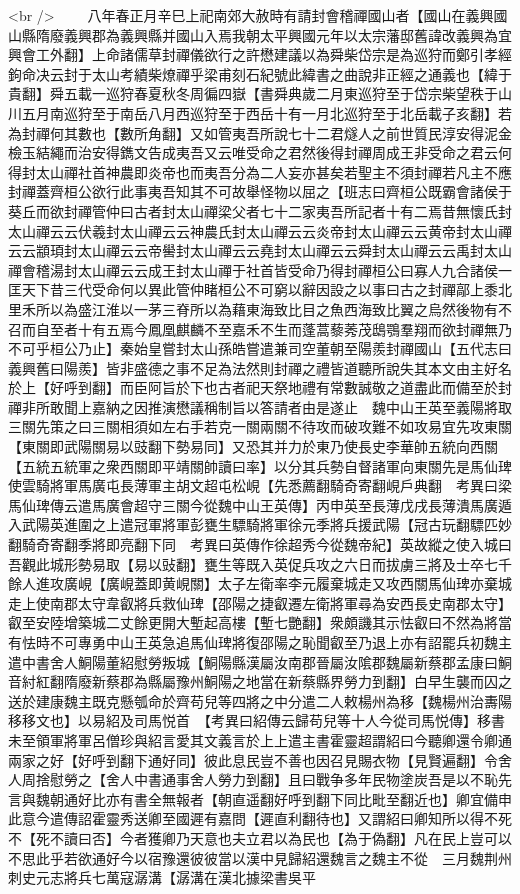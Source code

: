 <br />
　　八年春正月辛巳上祀南郊大赦時有請封會稽禪國山者【國山在義興國山縣隋廢義興郡為義興縣并國山入焉我朝太平興國元年以太宗藩邸舊諱改義興為宜興會工外翻】上命諸儒草封禪儀欲行之許懋建議以為舜柴岱宗是為巡狩而鄭引孝經鉤命决云封于太山考績柴燎禪乎梁甫刻石紀號此緯書之曲說非正經之通義也【緯于貴翻】舜五載一巡狩春夏秋冬周徧四嶽【書舜典歲二月東巡狩至于岱宗柴望秩于山川五月南巡狩至于南岳八月西巡狩至于西岳十有一月北巡狩至于北岳載子亥翻】若為封禪何其數也【數所角翻】又如管夷吾所說七十二君燧人之前世質民淳安得泥金檢玉結繩而治安得鐫文告成夷吾又云唯受命之君然後得封禪周成王非受命之君云何得封太山禪社首神農即炎帝也而夷吾分為二人妄亦甚矣若聖主不須封禪若凡主不應封禪蓋齊桓公欲行此事夷吾知其不可故舉怪物以屈之【班志曰齊桓公既霸會諸侯于葵丘而欲封禪管仲曰古者封太山禪梁父者七十二家夷吾所記者十有二焉昔無懷氏封太山禪云云伏羲封太山禪云云神農氏封太山禪云云炎帝封太山禪云云黄帝封太山禪云云顓頊封太山禪云云帝嚳封太山禪云云堯封太山禪云云舜封太山禪云云禹封太山禪會稽湯封太山禪云云成王封太山禪于社首皆受命乃得封禪桓公曰寡人九合諸侯一匡天下昔三代受命何以異此管仲睹桓公不可窮以辭因設之以事曰古之封禪鄗上黍北里禾所以為盛江淮以一茅三脊所以為藉東海致比目之魚西海致比翼之烏然後物有不召而自至者十有五焉今鳳凰麒麟不至嘉禾不生而蓬蒿藜莠茂鴟鶚羣翔而欲封禪無乃不可乎桓公乃止】秦始皇嘗封太山孫皓嘗遣兼司空董朝至陽羨封禪國山【五代志曰義興舊曰陽羨】皆非盛德之事不足為法然則封禪之禮皆道聽所說失其本文由主好名於上【好呼到翻】而臣阿旨於下也古者祀天祭地禮有常數誠敬之道盡此而備至於封禪非所敢聞上嘉納之因推演懋議稱制旨以答請者由是遂止　魏中山王英至義陽將取三關先策之曰三關相須如左右手若克一關兩關不待攻而破攻難不如攻易宜先攻東關【東關即武陽關易以豉翻下勢易同】又恐其并力於東乃使長史李華帥五統向西關【五統五統軍之衆西關即平靖關帥讀曰率】以分其兵勢自督諸軍向東關先是馬仙琕使雲騎將軍馬廣屯長薄軍主胡文超屯松峴【先悉薦翻騎奇寄翻峴戶典翻　考異曰梁馬仙琕傳云遣馬廣會超守三關今從魏中山王英傳】丙申英至長薄戊戌長薄潰馬廣遁入武陽英進圍之上遣冠軍將軍彭甕生驃騎將軍徐元季將兵援武陽【冠古玩翻驃匹妙翻騎奇寄翻季將即亮翻下同　考異曰英傳作徐超秀今從魏帝紀】英故縱之使入城曰吾觀此城形勢易取【易以䜴翻】甕生等既入英促兵攻之六日而拔虜三將及士卒七千餘人進攻廣峴【廣峴蓋即黄峴關】太子左衛率李元履棄城走又攻西關馬仙琕亦棄城走上使南郡太守韋叡將兵救仙琕【邵陽之捷叡遷左衛將軍尋為安西長史南郡太守】叡至安陸增築城二丈餘更開大塹起高樓【塹七艷翻】衆頗譏其示怯叡曰不然為將當有怯時不可專勇中山王英急追馬仙琕將復邵陽之恥聞叡至乃退上亦有詔罷兵初魏主遣中書舍人鮦陽董紹慰勞叛城【鮦陽縣漢屬汝南郡晉屬汝隂郡魏屬新蔡郡孟康曰鮦音紂紅翻隋廢新蔡郡為縣屬豫州鮦陽之地當在新蔡縣界勞力到翻】白早生襲而囚之送於建康魏主既克懸瓠命於齊苟兒等四將之中分遣二人敕楊州為移【魏楊州治夀陽移移文也】以易紹及司馬悦首　【考異曰紹傳云歸苟兒等十人今從司馬悦傳】移書未至領軍將軍呂僧珍與紹言愛其文義言於上上遣主書霍靈超謂紹曰今聽卿還令卿通兩家之好【好呼到翻下通好同】彼此息民豈不善也因召見賜衣物【見賢遍翻】令舍人周捨慰勞之【舍人中書通事舍人勞力到翻】且曰戰争多年民物塗炭吾是以不恥先言與魏朝通好比亦有書全無報者【朝直遥翻好呼到翻下同比毗至翻近也】卿宜備申此意今遣傳詔霍靈秀送卿至國遲有嘉問【遲直利翻待也】又謂紹曰卿知所以得不死不【死不讀曰否】今者獲卿乃天意也夫立君以為民也【為于偽翻】凡在民上豈可以不思此乎若欲通好今以宿豫還彼彼當以漢中見歸紹還魏言之魏主不從　三月魏荆州刺史元志將兵七萬寇潺溝【潺溝在漢北據梁書吳平